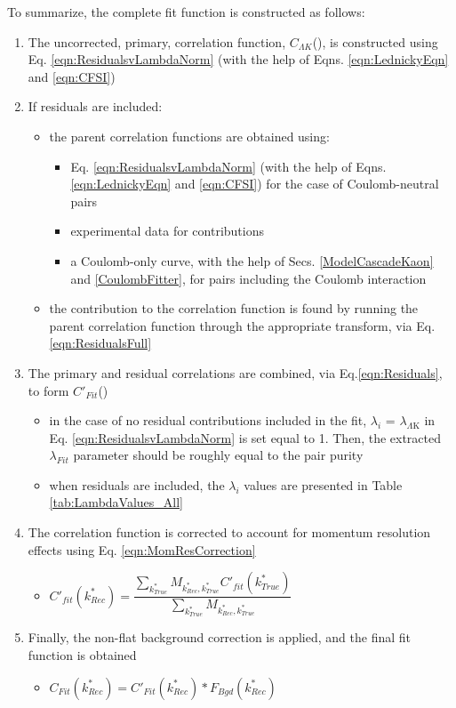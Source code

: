 \documentclass[../AnalysisNoteJBuxton.tex]{subfiles}
\begin{document}
To summarize, the complete fit function is constructed as follows:

\begin{enumerate}
 \item The uncorrected, primary, correlation function, $C_{\Lambda K}$(\ktrue), is constructed using Eq. \ref{eqn:ResidualsvLambdaNorm} (with the help of Eqns. \ref{eqn:LednickyEqn} and \ref{eqn:CFSI})
 \item If residuals are included:
 \begin{itemize}
  \item the parent correlation functions are obtained using:
  \begin{itemize}
   \item Eq. \ref{eqn:ResidualsvLambdaNorm} (with the help of Eqns. \ref{eqn:LednickyEqn} and \ref{eqn:CFSI}) for the case of Coulomb-neutral pairs
   \item \XiKpm experimental data for \XiKpm contributions
   \item a Coulomb-only curve, with the help of Secs. \ref{ModelCascadeKaon} and \ref{CoulombFitter}, for pairs including the Coulomb interaction 
  \end{itemize} 
 \item the contribution to the \LamK correlation function is found by running the parent correlation function through the appropriate transform, via Eq.\ref{eqn:ResidualsFull} 
 \end{itemize} 
 \item The primary and residual correlations are combined, via Eq.\ref{eqn:Residuals}, to form $C'_{Fit}$(\ktrue)
 \begin{itemize}
  \item in the case of no residual contributions included in the fit, $\lambda_{i}$ = $\lambda_{\Lambda\mathrm{K}}$ in Eq. \ref{eqn:ResidualsvLambdaNorm} is set equal to 1.  Then, the extracted $\lambda_{Fit}$ parameter should be roughly equal to the pair purity
  \item when residuals are included, the $\lambda_{i}$ values are presented in Table \ref{tab:LambdaValues_All}
 \end{itemize} 
 \item The correlation function is corrected to account for momentum resolution effects using Eq. \ref{eqn:MomResCorrection}
 \begin{itemize}
  \item $C'_{fit}(k^{*}_{Rec}) = \dfrac{\sum\limits_{k^{*}_{True}}M_{k^{*}_{Rec},k^{*}_{True}}C'_{fit}(k^{*}_{True})}{\sum\limits_{k^{*}_{True}}M_{k^{*}_{Rec},k^{*}_{True}}}$
 \end{itemize}
 \item Finally, the non-flat background correction is applied, and the final fit function is obtained
 \begin{itemize}
  \item $C_{Fit}(k^{*}_{Rec}) = C'_{Fit}(k^{*}_{Rec})*F_{Bgd}(k^{*}_{Rec})$
 \end{itemize}
\end{enumerate}
\end{document}
